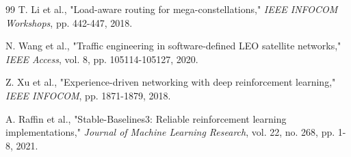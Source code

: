 \begin{thebibliography}{99}
T. Li et al., "Load-aware routing for mega-constellations," \textit{IEEE INFOCOM Workshops}, pp. 442-447, 2018.

N. Wang et al., "Traffic engineering in software-defined LEO satellite networks," \textit{IEEE Access}, vol. 8, pp. 105114-105127, 2020.

Z. Xu et al., "Experience-driven networking with deep reinforcement learning," \textit{IEEE INFOCOM}, pp. 1871-1879, 2018.

A. Raffin et al., "Stable-Baselines3: Reliable reinforcement learning implementations," \textit{Journal of Machine Learning Research}, vol. 22, no. 268, pp. 1-8, 2021.

\end{thebibliography}



